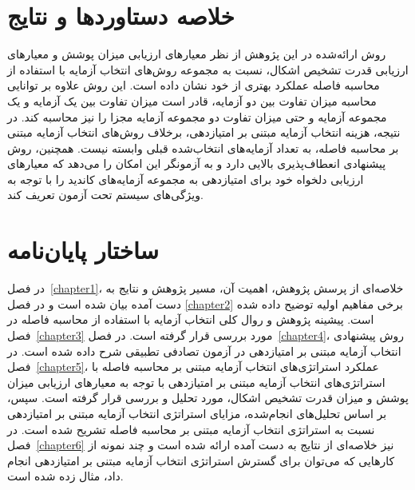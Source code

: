 \section{خلاصه دستاوردها و نتایج}

روش ارائه‌شده در این پژوهش از نظر معیارهای ارزیابی میزان پوشش و معیارهای ارزیابی قدرت تشخیص اشکال، نسبت به مجموعه روش‌های انتخاب آزمایه با استفاده از محاسبه فاصله عملکرد بهتری از خود نشان داده است. این روش علاوه بر توانایی محاسبه میزان تفاوت بین دو آزمایه، قادر است میزان تفاوت بین یک آزمایه و یک مجموعه آزمایه و حتی میزان تفاوت دو مجموعه آزمایه مجزا را نیز محاسبه کند. در نتیجه، هزینه انتخاب آزمایه مبتنی بر امتیازدهی، برخلاف روش‌های انتخاب آزمایه مبتنی بر محاسبه فاصله، به تعداد آزمایه‌های انتخاب‌شده قبلی وابسته نیست.
همچنین، روش پیشنهادی انعطاف‌پذیری بالایی دارد و به آزمونگر این امکان را می‌دهد که معیارهای ارزیابی دلخواه خود برای امتیازدهی به مجموعه آزمایه‌های کاندید را با توجه به ویژگی‌های سیستم تحت آزمون تعریف کند.

\section{ساختار پایان‌نامه}

در فصل~\ref{chapter1}، خلاصه‌ای از پرسش پژوهش، اهمیت آن، مسیر پژوهش و نتایج به دست آمده بیان شده است و در فصل  \ref{chapter2} برخی مفاهیم اولیه توضیح داده‌ شده‌ است. پیشینه پژوهش و روال کلی انتخاب آزمایه با استفاده از محاسبه فاصله در فصل~\ref{chapter3} مورد بررسی قرار گرفته است. در فصل~\ref{chapter4}، روش پیشنهادی انتخاب آزمایه مبتنی بر امتیازدهی در آزمون تصادفی تطبیقی شرح داده شده است. در فصل~\ref{chapter5}، عملکرد استراتژی‌های انتخاب آزمایه مبتنی بر محاسبه فاصله با استراتژی‌های انتخاب آزمایه مبتنی بر امتیازدهی با توجه به معیارهای ارزیابی میزان پوشش و میزان قدرت تشخیص اشکال، مورد تحلیل و بررسی قرار گرفته است. سپس، بر اساس تحلیل‌های انجام‌شده، مزایای استراتژی انتخاب آزمایه مبتنی بر امتیازدهی نسبت به استراتژی انتخاب آزمایه مبتنی بر  محاسبه فاصله تشریح شده است. در فصل~\ref{chapter6} نیز خلاصه‌ای از نتایج به دست آمده ارائه شده است و چند نمونه از کارهایی که می‌توان برای گسترش استراتژی انتخاب آزمایه مبتنی بر امتیازدهی انجام داد، مثال زده شده است.












